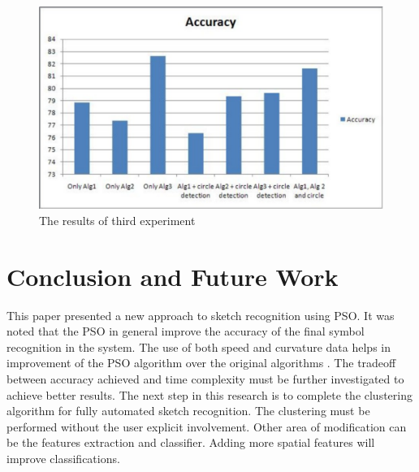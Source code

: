 \documentclass[a4paper,10pt]{IEEEconf}
\begin{document}
\begin{figure}[]
	\centering
		\includegraphics[scale=0.4]{images/test1.pdf}
	\caption{The results of third experiment}
	\label{fig:test3}
\end{figure}
\section{Conclusion and Future Work}
\label{ConclusionandFutureWork}
This paper presented a new approach to sketch recognition using PSO. It was noted that the PSO in general improve the accuracy of the final symbol recognition in the system. The use of both speed and curvature data helps in improvement of the PSO algorithm over the original algorithms \cite{CruveDivisionSwarm,PolygonApproximationPSO}. The tradeoff between accuracy achieved and time complexity must be further investigated to achieve better results.  
The next step in this research is to complete the clustering algorithm for fully automated sketch recognition. The clustering must be performed without the user explicit involvement. Other area of modification can be the features extraction and classifier. Adding more spatial features will improve classifications.  %
%

\end{document}
